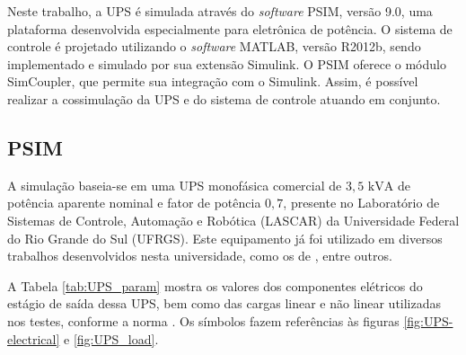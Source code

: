 \documentclass[repeatfields,oneside]{tcc}
\begin{document}
Neste trabalho, a UPS é simulada através do \textit{software} PSIM, versão 9.0, uma plataforma desenvolvida especialmente para eletrônica de potência.
O sistema de controle é projetado utilizando o \textit{software} MATLAB, versão R2012b, sendo implementado e simulado por sua extensão Simulink.
O PSIM oferece o módulo SimCoupler, que permite sua integração com o Simulink.
Assim, é possível realizar a cossimulação da UPS e do sistema de controle atuando em conjunto.



\subsection{PSIM}

A simulação baseia-se em uma UPS monofásica comercial de $3,5 \text{ kVA}$ de potência aparente nominal e fator de potência $0,7$, presente no Laboratório de Sistemas de Controle, Automação e Robótica (LASCAR) da Universidade Federal do Rio Grande do Sul (UFRGS).
Este equipamento já foi utilizado em diversos trabalhos desenvolvidos nesta universidade, como os de \textcite{Pereira2014, Schildt2014, Corleta2015, Lorenzini2015, Lorenzini2019, Corleta2016, Keiel2017, Keiel2019, Bertoldi2019, Bruna2020}, entre outros.

A Tabela \ref{tab:UPS_param} mostra os valores dos componentes elétricos do estágio de saída dessa UPS, bem como das cargas linear e não linear utilizadas nos testes, conforme a norma \textcite{IEC62040-3:2011}.
Os símbolos fazem referências às figuras \ref{fig:UPS-electrical} e \ref{fig:UPS_load}.
\end{document}
